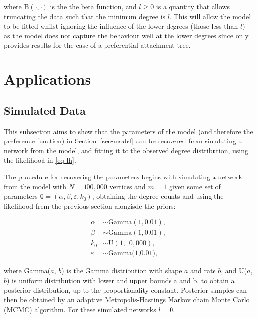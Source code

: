 \documentclass[
  sn-basic,
]{sn-jnl}
\theoremstyle{plain}
\theoremstyle{plain}
\theoremstyle{remark}
\begin{document}
where \(\text{B}(\cdot,\cdot)\) is the the beta function, and \(l\ge0\)
is a quantity that allows truncating the data such that the minimum
degree is \(l\). This will allow the model to be fitted whilst ignoring
the influence of the lower degrees (those less than \(l\)) as the model
does not capture the behaviour well at the lower degrees since
\citet{rudas07} only provides results for the case of a preferential
attachment tree.

\section{Applications}\label{applications}

\subsection{Simulated Data}\label{sec-sim}

This subsection aims to show that the parameters of the model (and
therefore the preference function) in Section~\ref{sec-model} can be
recovered from simulating a network from the model, and fitting it to
the observed degree distribution, using the likelihood in \eqref{eq-lh}.

The procedure for recovering the parameters begins with simulating a
network from the model with \(N=100,000\) vertices and \(m=1\) given
some set of parameters
\(\pmb\theta = (\alpha, \beta, \varepsilon, k_0)\), obtaining the degree
counts and using the likelihood from the previous section alongisde the
priors:

\begin{align*}
\alpha&\sim \text{Gamma}(1,0.01),\\
\beta &\sim  \text{Gamma}(1,0.01),\\
k_0 &\sim \text{U}(1,10,000),\\
\varepsilon &\sim \text{Gamma(1,0.01)},
\end{align*}

where Gamma(\(a\), \(b\)) is the Gamma distribution with shape \(a\) and
rate \(b\), and U(\(a\), \(b\)) is uniform distribution with lower and
upper bounds a and b, to obtain a posterior distribution, up to the
proportionality constant. Posterior samples can then be obtained by an
adaptive Metropolis-Hastings Markov chain Monte Carlo (MCMC) algorithm.
For these simulated networks \(l=0\).
\end{document}
